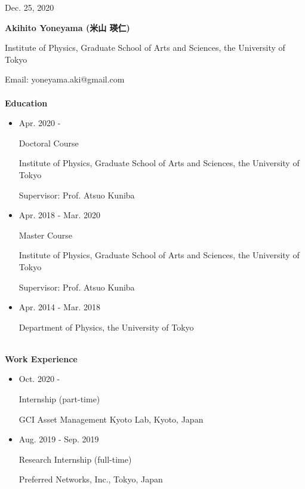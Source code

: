 \documentclass[dvipdfmx]{jsarticle}
\begin{document}
%
%
%
%
\begin{flushright}
Dec. 25, 2020
\end{flushright}
%
%
%
%
{\bf\Large Akihito Yoneyama (米山 瑛仁)}
\vspace{3mm}
\par
Institute of Physics, Graduate School of Arts and Sciences, the University of Tokyo
\par
Email: yoneyama.aki@gmail.com
%
%
%
%
{\ }\\\\
\vspace{3mm}
{\bf\large Education}
\vspace{-6mm}
\\\hrulefill
\begin{itemize}
\item
Apr. 2020 - 
\par
Doctoral Course
\par
Institute of Physics, Graduate School of Arts and Sciences, the University of Tokyo
\par
Supervisor: Prof. Atsuo Kuniba
\item
Apr. 2018 - Mar. 2020
\par
Master Course
\par
Institute of Physics, Graduate School of Arts and Sciences, the University of Tokyo
\par
Supervisor: Prof. Atsuo Kuniba
\item
Apr. 2014 - Mar. 2018
\par
Department of Physics, the University of Tokyo
\end{itemize}
%
%
%
%
{\ }\\
\vspace{3mm}
{\bf\large Work Experience}
\vspace{-6mm}
\\\hrulefill
\begin{itemize}
\item
Oct. 2020 - 
\par
Internship (part-time)
\par
GCI Asset Management Kyoto Lab, Kyoto, Japan
%
%
\item
Aug. 2019 - Sep. 2019
\par
Research Internship (full-time)
\par
Preferred Networks, Inc., Tokyo, Japan
\end{itemize}
\end{document}
